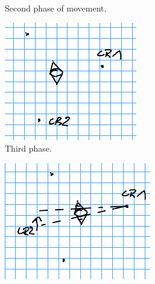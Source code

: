 \documentclass[english,RandD]{rapportPFE}  %
\begin{document}
\begin{figure}[h!]
\begin{subfigure}[t]{0.3\linewidth}
						\caption{Second phase of movement.}
						\label{fig:triangle_4}
					\end{subfigure}
					\hfill
					\begin{subfigure}[t]{0.3\linewidth}
						\centering
						\includegraphics[width=\linewidth]{graphics/triangle_5.png}
						\caption{Third phase.}
						\label{fig:triangle_5}
					\end{subfigure}
					\hfill
					\begin{subfigure}[t]{0.3\linewidth}
						\centering
						\includegraphics[width=\linewidth]{graphics/triangle_6.png}

\end{subfigure}
\end{figure}
\end{document}
